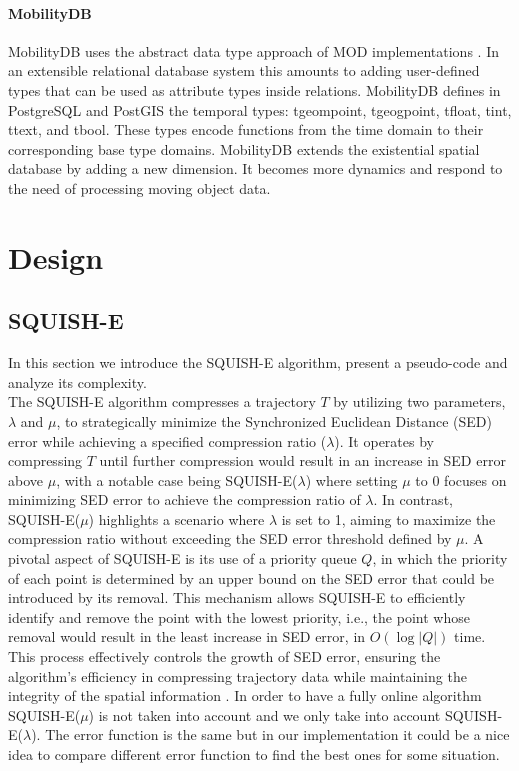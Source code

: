 \documentclass[twoside,12pt, a4paper]{report}
\begin{document}
\subsubsection{MobilityDB}
MobilityDB uses the abstract data type approach of MOD implementations
\cite{guting2000foundation}. In an extensible relational database system this
amounts to adding user-defined types that can be used as attribute
types inside relations. MobilityDB defines in PostgreSQL and PostGIS
the temporal types: tgeompoint, tgeogpoint, tfloat, tint,
ttext, and tbool. These types encode functions from the time
domain to their corresponding base type domains. MobilityDB extends the existential
spatial database by adding a new dimension. It becomes more dynamics and respond to the need 
of processing moving object data. 


\chapter{Design}
\section{SQUISH-E}
In this section we introduce the SQUISH-E algorithm, present a pseudo-code and analyze its complexity. \\

The SQUISH-E algorithm compresses a trajectory \(T\) by utilizing two parameters, \(\lambda\) and \(\mu\), to strategically minimize the Synchronized Euclidean Distance (SED) error while achieving a specified compression ratio (\(\lambda\)). It operates by compressing \(T\) until further compression would result in an increase in SED error above \(\mu\), with a notable case being SQUISH-E(\(\lambda\)) where setting \(\mu\) to 0 focuses on minimizing SED error to achieve the compression ratio of \(\lambda\). In contrast, SQUISH-E(\(\mu\)) highlights a scenario where \(\lambda\) is set to 1, aiming to maximize the compression ratio without exceeding the SED error threshold defined by \(\mu\). A pivotal aspect of SQUISH-E is its use of a priority queue \(Q\), in which the priority of each point is determined by an upper bound on the SED error that could be introduced by its removal. This mechanism allows SQUISH-E to efficiently identify and remove the point with the lowest priority, i.e., the point whose removal would result in the least increase in SED error, in \(O(\log |Q|)\) time. This process effectively controls the growth of SED error, ensuring the algorithm's efficiency in compressing trajectory data while maintaining the integrity of the spatial information \cite{muckell2014compression}. In order to have a fully online algorithm SQUISH-E(\(\mu\)) is not taken into account and we only take into account SQUISH-E(\(\lambda\)). The error function is the same but in our implementation it could be a nice idea to compare different error function to find the best ones for some situation.
\end{document}
